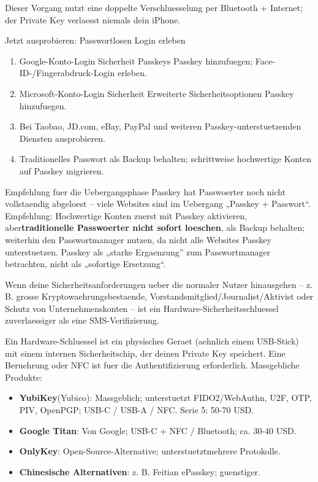 Dieser Vorgang nutzt eine doppelte Verschluesselung per Bluetooth + Internet; der Private Key verlaesst niemals dein iPhone.

\begin{tcbpractice}{Jetzt ausprobieren: Passwortlosen Login erleben}
\begin{enumerate}
  \item Google-Konto-Login Sicherheit Passkeys Passkey hinzufuegen; Face-ID-/Fingerabdruck-Login erleben.
  \item Microsoft-Konto-Login Sicherheit Erweiterte Sicherheitsoptionen Passkey hinzufuegen.
  \item Bei Taobao, JD.com, eBay, PayPal und weiteren Passkey-unterstuetzenden Diensten ausprobieren.
  \item Traditionelles Passwort als Backup behalten; schrittweise hochwertige Konten auf Passkey migrieren.
\end{enumerate}

\end{tcbpractice}

\begin{tcbwarn}{Empfehlung fuer die Uebergangsphase}
Passkey hat Passwoerter noch nicht vollstaendig abgeloest – viele Websites sind im Uebergang „Passkey + Passwort“. Empfehlung: Hochwertige Konten zuerst mit Passkey aktivieren, aber\textbf{traditionelle Passwoerter nicht sofort loeschen}, als Backup behalten; weiterhin den Passwortmanager nutzen, da nicht alle Websites Passkey unterstuetzen. Passkey als „starke Ergaenzung” zum Passwortmanager betrachten, nicht als „sofortige Ersetzung“.

\end{tcbwarn}


Wenn deine Sicherheitsanforderungen ueber die normaler Nutzer hinausgehen – z. B. grosse Kryptowaehrungsbestaende, Vorstandsmitglied/Journalist/Aktivist oder Schutz von Unternehmenskonten – ist ein Hardware-Sicherheitsschluessel zuverlaessiger als eine SMS-Verifizierung.


Ein Hardware-Schluessel ist ein physisches Geraet (aehnlich einem USB-Stick) mit einem internen Sicherheitschip, der deinen Private Key speichert. Eine Beruehrung oder NFC ist fuer die Authentifizierung erforderlich. Massgebliche Produkte:

\begin{itemize}
  \item \textbf{YubiKey}(Yubico): Massgeblich; unterstuetzt FIDO2/WebAuthn, U2F, OTP, PIV, OpenPGP; USB-C / USB-A / NFC. Serie 5: 50-70 USD.
  \item \textbf{Google Titan}: Von Google; USB-C + NFC / Bluetooth; ca. 30-40 USD.
  \item \textbf{OnlyKey}: Open-Source-Alternative; unterstuetztmehrere Protokolle.
  \item \textbf{Chinesische Alternativen}: z. B. Feitian ePasskey; guenstiger.
\end{itemize}

